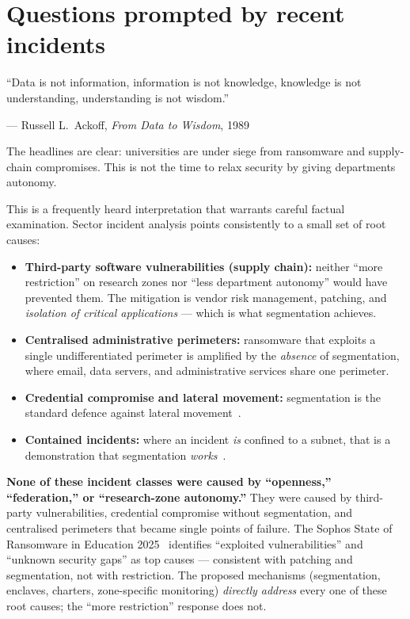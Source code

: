 \section{Questions prompted by recent incidents}
\label{sec:q-incidents}

\epigraph{``Data is not information, information is not knowledge, knowledge is not understanding, understanding is not wisdom.''}{--- Russell L.\ Ackoff, \textit{From Data to Wisdom}, 1989}

\begin{clarificationbox}
The headlines are clear: universities are under siege from ransomware and supply-chain compromises. This is not the time to relax security by giving departments autonomy.
\end{clarificationbox}

\begin{answerbox}[Answer to Q7.1]
This is a frequently heard interpretation that warrants careful factual examination. Sector incident analysis points consistently to a small set of root causes:

\begin{itemize}[nosep]
    \item \textbf{Third-party software vulnerabilities (supply chain):} neither ``more restriction'' on research zones nor ``less department autonomy'' would have prevented them. The mitigation is vendor risk management, patching, and \emph{isolation of critical applications} --- which is what segmentation achieves.
    \item \textbf{Centralised administrative perimeters:} ransomware that exploits a single undifferentiated perimeter is amplified by the \emph{absence} of segmentation, where email, data servers, and administrative services share one perimeter.
    \item \textbf{Credential compromise and lateral movement:} segmentation is the standard defence against lateral movement~\cite{verizon-dbir2024}.
    \item \textbf{Contained incidents:} where an incident \emph{is} confined to a subnet, that is a demonstration that segmentation \emph{works}~\cite{rennes-cyber}.
\end{itemize}

\noindent\textbf{None of these incident classes were caused by ``openness,'' ``federation,'' or ``research-zone autonomy.''} They were caused by third-party vulnerabilities, credential compromise without segmentation, and centralised perimeters that became single points of failure. The Sophos State of Ransomware in Education 2025~\cite{sophos-ransomware-edu2025} identifies ``exploited vulnerabilities'' and ``unknown security gaps'' as top causes --- consistent with patching and segmentation, not with restriction. The proposed mechanisms (segmentation, enclaves, charters, zone-specific monitoring) \emph{directly address} every one of these root causes; the ``more restriction'' response does not.
\end{answerbox}

